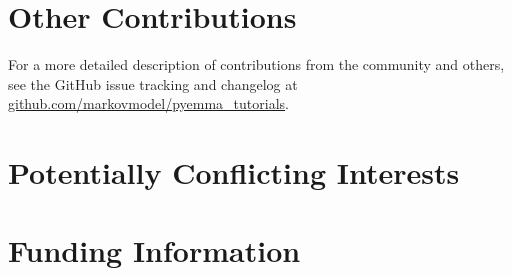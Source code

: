 \documentclass[9pt,tutorial,lineno,onehalfspacing]{livecoms}
\newcommand{\githubrepository}{\url{github.com/markovmodel/pyemma_tutorials}}
\begin{document}
\section{Other Contributions}
%
For a more detailed description of contributions from the community and others, see the GitHub issue tracking and changelog at \githubrepository{}.

\section{Potentially Conflicting Interests}

\section{Funding Information}




\end{document}
